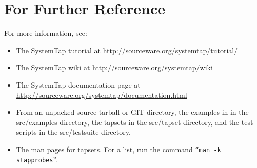 \documentclass[twoside,english]{article}
\begin{document}
\section{For Further Reference\label{sec:For-Further-Reference}}

For more information, see:
\begin{itemize}
\item The SystemTap tutorial at \url{http://sourceware.org/systemtap/tutorial/}
\item The SystemTap wiki at \url{http://sourceware.org/systemtap/wiki}
\item The SystemTap documentation page at \url{http://sourceware.org/systemtap/documentation.html}
\item From an unpacked source tarball or GIT directory, the examples in in the
src/examples directory, the tapsets in the src/tapset directory, and the
test scripts in the src/testsuite directory.
\item The man pages for tapsets. For a list, run the command \texttt{{}``man -k
stapprobes}''.
\end {itemize}

\setcounter{secnumdepth}{0}
\newpage{}
\printindex{}
\end{document}
